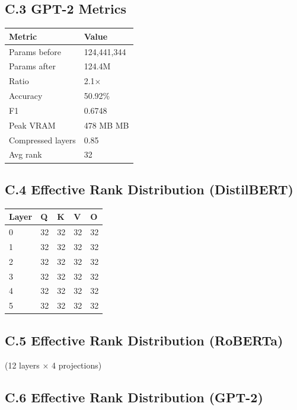 \subsection{C.3 GPT-2 Metrics}

\begin{table}[H]
\centering
\small
\begin{tabular}{ll}
\toprule
\textbf{Metric} & \textbf{Value} \\
\midrule
Params before & 124,441,344 \\
Params after & 124.4M \\
Ratio & 2.1$\times$ \\
Accuracy & 50.92\% \\
F1 & 0.6748 \\
Peak VRAM & 478 MB MB \\
Compressed layers & 0.85 \\
Avg rank & 32 \\
\bottomrule
\end{tabular}
\end{table}

\subsection{C.4 Effective Rank Distribution (DistilBERT)}

\begin{table}[H]
\centering
\small
\begin{tabular}{lllll}
\toprule
\textbf{Layer} & \textbf{Q} & \textbf{K} & \textbf{V} & \textbf{O} \\
\midrule
0 & 32 & 32 & 32 & 32 \\
1 & 32 & 32 & 32 & 32 \\
2 & 32 & 32 & 32 & 32 \\
3 & 32 & 32 & 32 & 32 \\
4 & 32 & 32 & 32 & 32 \\
5 & 32 & 32 & 32 & 32 \\
\bottomrule
\end{tabular}
\end{table}

\subsection{C.5 Effective Rank Distribution (RoBERTa)}

(12 layers $\times$ 4 projections)

\subsection{C.6 Effective Rank Distribution (GPT-2)}

